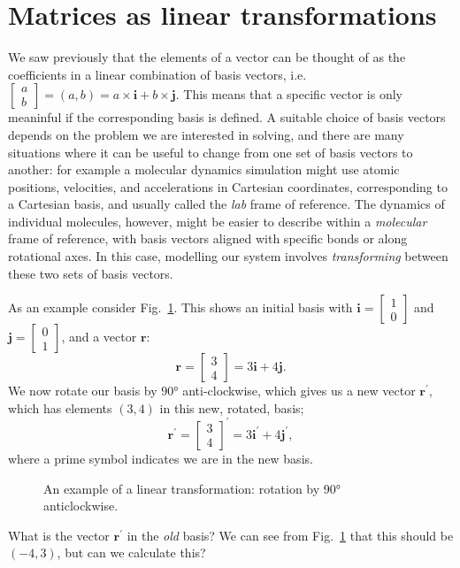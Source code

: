 \documentclass[a4paper]{article}
\newcommand{\bvec}[1]{\mathbf{#1}}
\newcommand{\cvec}[2]{\begin{bmatrix}#1\\#2\end{bmatrix}}
\begin{document}
\section{Matrices as linear transformations}

We saw previously that the elements of a vector can be thought of as the coefficients in a linear combination of basis vectors, i.e.~ $\begin{bmatrix}a\\b\end{bmatrix}=(a, b)=a\times\bvec{i}+b\times\bvec{j}$. This means that a specific vector is only meaninful if the corresponding basis is defined. A suitable choice of basis vectors depends on the problem we are interested in solving, and there are many situations where it can be useful to change from one set of basis vectors to another: for example a molecular dynamics simulation might use atomic positions, velocities, and accelerations in Cartesian coordinates, corresponding to a Cartesian basis, and usually called the \emph{lab} frame of reference. The dynamics of individual molecules, however, might be easier to describe within a \emph{molecular} frame of reference, with basis vectors aligned with specific bonds or along rotational axes. In this case, modelling our system involves \emph{transforming} between these two sets of basis vectors.

As an example consider Fig.~\ref{fig:rotation_example}. This shows an initial  basis with $\bvec{i}=\cvec{1}{0}$ and $\bvec{j}=\cvec{0}{1}$, and a vector $\bvec{r}$:
\begin{equation*}
\bvec{r}=\cvec{3}{4}=3\bvec{i}+4\bvec{j}. 
\end{equation*}
We now rotate our basis by $\ang{90}$ anti-clockwise, which gives us a new vector $\bvec{r^\prime}$, which has elements $(3,4)$ in this new, rotated, basis;
\begin{equation*}
\bvec{r^\prime}=\cvec{3}{4}^\prime=3\bvec{i^\prime}+4\bvec{j^\prime},
\end{equation*}
where a prime symbol indicates we are in the new basis.
\begin{figure}[tb]
  \centering
    \caption{\label{fig:rotation_example}An example of a linear transformation: rotation by \ang{90} anticlockwise.}
\end{figure}
What is the vector $\bvec{r^\prime}$ in the \emph{old} basis? We can see from Fig.~\ref{fig:rotation_example} that this should be $(-4,3)$, but can we calculate this?
\end{document}
